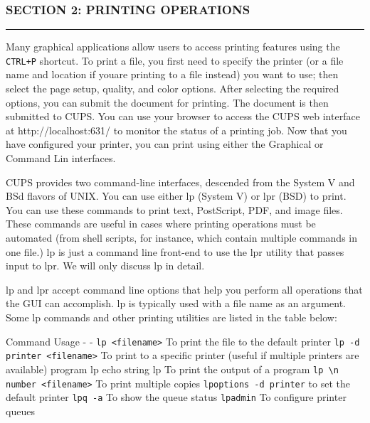 \subsubsection{SECTION 2: PRINTING
OPERATIONS}\label{section-2-printing-operations}

\begin{center}\rule{3in}{0.4pt}\end{center}

Many graphical applications allow users to access printing features
using the \texttt{CTRL+P} shortcut. To print a file, you first need to
specify the printer (or a file name and location if youare printing to a
file instead) you want to use; then select the page setup, quality, and
color options. After selecting the required options, you can submit the
document for printing. The document is then submitted to CUPS. You can
use your browser to access the CUPS web interface at
http://localhost:631/ to monitor the status of a printing job. Now that
you have configured your printer, you can print using either the
Graphical or Command Lin interfaces.

CUPS provides two command-line interfaces, descended from the System V
and BSd flavors of UNIX. You can use either lp (System V) or lpr (BSD)
to print. You can use these commands to print text, PostScript, PDF, and
image files. These commands are useful in cases where printing
operations must be automated (from shell scripts, for instance, which
contain multiple commands in one file.) lp is just a command line
front-end to use the lpr utility that passes input to lpr. We will only
discuss lp in detail.

lp and lpr accept command line options that help you perform all
operations that the GUI can accomplish. lp is typically used with a file
name as an argument. Some lp commands and other printing utilities are
listed in the table below:

Command \textbar{} Usage - \textbar{} -
\texttt{lp \textless{}filename\textgreater{}} \textbar{} To print the
file to the default printer
\texttt{lp -d printer \textless{}filename\textgreater{}} \textbar{} To
print to a specific printer (useful if multiple printers are available)
program \textbar{} lp \n echo string \textbar{} lp \textbar{} To print
the output of a program
\texttt{lp \textbackslash{}n number \textless{}filename\textgreater{}}
\textbar{} To print multiple copies \texttt{lpoptions -d printer}
\textbar{} to set the default printer \texttt{lpq -a} \textbar{} To show
the queue status \texttt{lpadmin} \textbar{} To configure printer queues


